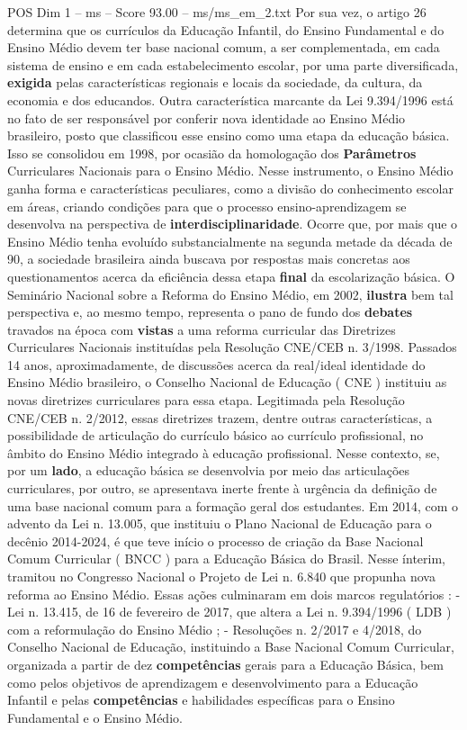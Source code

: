 \begin{textsample}{POS Dim 1 – ms – Score 93.00 – ms/ms\_em\_2.txt}
Por sua vez, o artigo 26 determina que os currículos da Educação Infantil, do Ensino Fundamental e do Ensino Médio devem ter base nacional comum, a ser complementada, em cada sistema de ensino e em cada estabelecimento escolar, por uma parte diversificada, \textbf{exigida} pelas características regionais e locais da sociedade, da cultura, da economia e dos educandos.
Outra característica marcante da Lei 9.394/1996 está no fato de ser responsável por conferir nova identidade ao Ensino Médio brasileiro, posto que classificou esse ensino como uma etapa da educação básica.
Isso se consolidou em 1998, por ocasião da homologação dos \textbf{Parâmetros} Curriculares Nacionais para o Ensino Médio.
Nesse instrumento, o Ensino Médio ganha forma e características peculiares, como a divisão do conhecimento escolar em áreas, criando condições para que o processo ensino-aprendizagem se desenvolva na perspectiva de \textbf{interdisciplinaridade}.
Ocorre que, por mais que o Ensino Médio tenha evoluído substancialmente na segunda metade da década de 90, a sociedade brasileira ainda buscava por respostas mais concretas aos questionamentos acerca da eficiência dessa etapa \textbf{final} da escolarização básica.
O Seminário Nacional sobre a Reforma do Ensino Médio, em 2002, \textbf{ilustra} bem tal perspectiva e, ao mesmo tempo, representa o pano de fundo dos \textbf{debates} travados na época com \textbf{vistas} a uma reforma curricular das Diretrizes Curriculares Nacionais instituídas pela Resolução CNE/CEB n. 3/1998.
Passados 14 anos, aproximadamente, de discussões acerca da real/ideal identidade do Ensino Médio brasileiro, o Conselho Nacional de Educação ( CNE ) instituiu as novas diretrizes curriculares para essa etapa.
Legitimada pela Resolução CNE/CEB n. 2/2012, essas diretrizes trazem, dentre outras características, a possibilidade de articulação do currículo básico ao currículo profissional, no âmbito do Ensino Médio integrado à educação profissional.
Nesse contexto, se, por um \textbf{lado}, a educação básica se desenvolvia por meio das articulações curriculares, por outro, se apresentava inerte frente à urgência da definição de uma base nacional comum para a formação geral dos estudantes.
Em 2014, com o advento da Lei n. 13.005, que instituiu o Plano Nacional de Educação para o decênio 2014-2024, é que teve início o processo de criação da Base Nacional Comum Curricular ( BNCC ) para a Educação Básica do Brasil.
Nesse ínterim, tramitou no Congresso Nacional o Projeto de Lei n. 6.840 que propunha nova reforma ao Ensino Médio.
Essas ações culminaram em dois marcos regulatórios : - Lei n. 13.415, de 16 de fevereiro de 2017, que altera a Lei n. 9.394/1996 ( LDB ) com a reformulação do Ensino Médio ; - Resoluções n. 2/2017 e 4/2018, do Conselho Nacional de Educação, instituindo a Base Nacional Comum Curricular, organizada a partir de dez \textbf{competências} gerais para a Educação Básica, bem como pelos objetivos de aprendizagem e desenvolvimento para a Educação Infantil e pelas \textbf{competências} e habilidades específicas para o Ensino Fundamental e o Ensino Médio.

\end{textsample}

